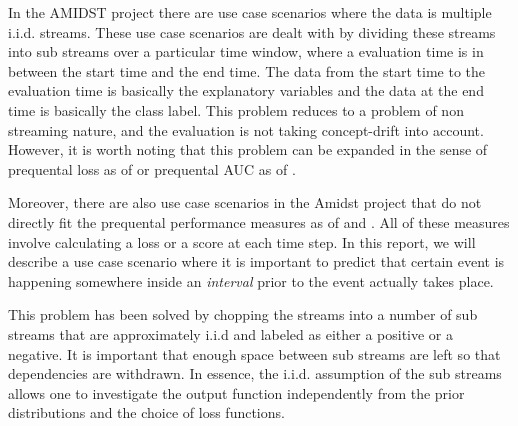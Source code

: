 In the AMIDST project there are use case scenarios where the data is multiple i.i.d. streams.  These use case scenarios are dealt with by dividing these streams into sub streams over a particular time window, where a evaluation time is in between the start time and the end time.  The data from the start time to the evaluation time is basically the explanatory variables and the data at the end time is basically the class label.  This problem reduces to a problem of non streaming nature, and the evaluation is not taking concept-drift into account.  However, it is worth noting that this problem can be expanded in the sense of prequental loss as of \cite{Gam13} or prequental AUC as of \cite{Brz14}.  

Moreover, there are also use case scenarios in the Amidst project that do not directly fit the prequental performance measures as of \cite{Gam13} and \cite{Brz14}.  All of these measures involve calculating a loss or a score at each time step.  In this report, we will describe a use case scenario where it is important to predict that certain event is happening somewhere inside an \emph{interval} prior to the event actually takes place.  

This problem has been solved by chopping the streams into a number of sub streams that are approximately i.i.d and labeled as either a positive or a negative.  It is important that enough space between sub streams are left so that dependencies are withdrawn.  In essence, the i.i.d. assumption of the sub streams allows one to investigate the output function independently from the prior distributions and the choice of loss functions.  


%


%
%
%

